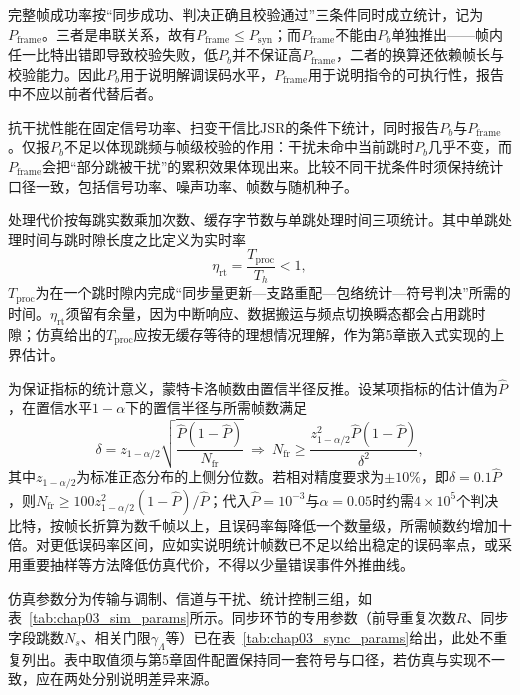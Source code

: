 完整帧成功率按“同步成功、判决正确且校验通过”三条件同时成立统计，记为$P_{\mathrm{frame}}$。三者是串联关系，故有$P_{\mathrm{frame}}\le P_{\mathrm{syn}}$；而$P_{\mathrm{frame}}$不能由$P_b$单独推出——帧内任一比特出错即导致校验失败，低$P_b$并不保证高$P_{\mathrm{frame}}$，二者的换算还依赖帧长与校验能力。因此$P_b$用于说明解调误码水平，$P_{\mathrm{frame}}$用于说明指令的可执行性，报告中不应以前者代替后者。

抗干扰性能在固定信号功率、扫变干信比$\mathrm{JSR}$的条件下统计，同时报告$P_b$与$P_{\mathrm{frame}}$。仅报$P_b$不足以体现跳频与帧级校验的作用：干扰未命中当前跳时$P_b$几乎不变，而$P_{\mathrm{frame}}$会把“部分跳被干扰”的累积效果体现出来。比较不同干扰条件时须保持统计口径一致，包括信号功率、噪声功率、帧数与随机种子。

处理代价按每跳实数乘加次数、缓存字节数与单跳处理时间三项统计。其中单跳处理时间与跳时隙长度之比定义为实时率
\begin{equation}
 \eta_{\mathrm{rt}}=\frac{T_{\mathrm{proc}}}{T_h}<1,
\label{eq:chap03_realtime}
\end{equation}
$T_{\mathrm{proc}}$为在一个跳时隙内完成“同步量更新—支路重配—包络统计—符号判决”所需的时间。$\eta_{\mathrm{rt}}$须留有余量，因为中断响应、数据搬运与频点切换瞬态都会占用跳时隙；仿真给出的$T_{\mathrm{proc}}$应按无缓存等待的理想情况理解，作为第5章嵌入式实现的上界估计。

为保证指标的统计意义，蒙特卡洛帧数由置信半径反推。设某项指标的估计值为$\hat P$，在置信水平$1-\alpha$下的置信半径与所需帧数满足
\begin{equation}
 \delta=z_{1-\alpha/2}\sqrt{\frac{\hat P(1-\hat P)}{N_{\mathrm{fr}}}}
 \ \Longrightarrow\
 N_{\mathrm{fr}}\ge\frac{z_{1-\alpha/2}^{2}\hat P(1-\hat P)}{\delta^{2}},
\label{eq:chap03_confidence}
\end{equation}
其中$z_{1-\alpha/2}$为标准正态分布的上侧分位数。若相对精度要求为$\pm10\%$，即$\delta=0.1\hat P$，则$N_{\mathrm{fr}}\ge100z_{1-\alpha/2}^{2}(1-\hat P)/\hat P$；代入$\hat P=10^{-3}$与$\alpha=0.05$时约需$4\times10^{5}$个判决比特，按帧长折算为数千帧以上，且误码率每降低一个数量级，所需帧数约增加十倍。对更低误码率区间，应如实说明统计帧数已不足以给出稳定的误码率点，或采用重要抽样等方法降低仿真代价，不得以少量错误事件外推曲线。

仿真参数分为传输与调制、信道与干扰、统计控制三组，如表~\ref{tab:chap03_sim_params}所示。同步环节的专用参数（前导重复次数$R$、同步字段跳数$N_s$、相关门限$\gamma_\Lambda$等）已在表~\ref{tab:chap03_sync_params}给出，此处不重复列出。表中取值须与第5章固件配置保持同一套符号与口径，若仿真与实现不一致，应在两处分别说明差异来源。

